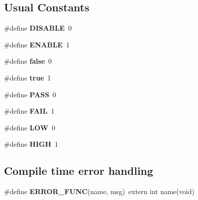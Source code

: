 \subsection*{Usual Constants}
\begin{DoxyCompactItemize}
\item 
\hypertarget{group__group__xmega__utils_ga99496f7308834e8b220f7894efa0b6ab}{\#define {\bfseries D\-I\-S\-A\-B\-L\-E}~0}\label{group__group__xmega__utils_ga99496f7308834e8b220f7894efa0b6ab}

\item 
\hypertarget{group__group__xmega__utils_ga514ad415fb6125ba296793df7d1a468a}{\#define {\bfseries E\-N\-A\-B\-L\-E}~1}\label{group__group__xmega__utils_ga514ad415fb6125ba296793df7d1a468a}

\item 
\hypertarget{group__group__xmega__utils_ga65e9886d74aaee76545e83dd09011727}{\#define {\bfseries false}~0}\label{group__group__xmega__utils_ga65e9886d74aaee76545e83dd09011727}

\item 
\hypertarget{group__group__xmega__utils_ga41f9c5fb8b08eb5dc3edce4dcb37fee7}{\#define {\bfseries true}~1}\label{group__group__xmega__utils_ga41f9c5fb8b08eb5dc3edce4dcb37fee7}

\item 
\hypertarget{group__group__xmega__utils_gaba5c54fadff8d880b1945dde87496e31}{\#define {\bfseries P\-A\-S\-S}~0}\label{group__group__xmega__utils_gaba5c54fadff8d880b1945dde87496e31}

\item 
\hypertarget{group__group__xmega__utils_gabb508ea8227673f419e9fe3a86c30d8e}{\#define {\bfseries F\-A\-I\-L}~1}\label{group__group__xmega__utils_gabb508ea8227673f419e9fe3a86c30d8e}

\item 
\hypertarget{group__group__xmega__utils_gab811d8c6ff3a505312d3276590444289}{\#define {\bfseries L\-O\-W}~0}\label{group__group__xmega__utils_gab811d8c6ff3a505312d3276590444289}

\item 
\hypertarget{group__group__xmega__utils_ga5bb885982ff66a2e0a0a45a8ee9c35e2}{\#define {\bfseries H\-I\-G\-H}~1}\label{group__group__xmega__utils_ga5bb885982ff66a2e0a0a45a8ee9c35e2}

\end{DoxyCompactItemize}
\subsection*{Compile time error handling}
\begin{DoxyCompactItemize}
\item 
\hypertarget{group__group__xmega__utils_ga61ff56576c705fea11ab4f415ef45726}{\#define {\bfseries E\-R\-R\-O\-R\-\_\-\-F\-U\-N\-C}(name, msg)~extern int name(void)}\label{group__group__xmega__utils_ga61ff56576c705fea11ab4f415ef45726}

\end{DoxyCompactItemize}
